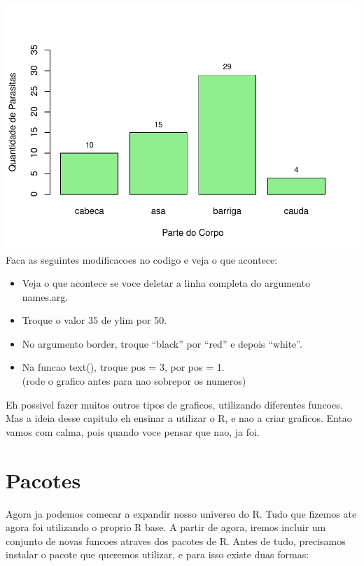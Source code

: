 \documentclass[
]{book}
\providecommand{\tightlist}{%
  \setlength{\itemsep}{0pt}\setlength{\parskip}{0pt}}
\begin{document}
\includegraphics{_main_files/figure-latex/4_basic_hist-1.pdf}
Faca as seguintes modificacoes no codigo e veja o que acontece:

\begin{itemize}
\tightlist
\item
  Veja o que acontece se voce deletar a linha completa do argumento names.arg.\\
\item
  Troque o valor 35 de ylim por 50.\\
\item
  No argumento border, troque ``black'' por ``red'' e depois ``white''.\\
\item
  Na funcao text(), troque pos = 3, por pos = 1.\\
  (rode o grafico antes para nao sobrepor os numeros)
\end{itemize}

Eh possivel fazer muitos outros tipos de graficos, utilizando diferentes funcoes. Mas a ideia desse capitulo eh ensinar a utilizar o R, e nao a criar graficos. Entao vamos com calma, pois quando voce pensar que nao, ja foi.

\hypertarget{pacotes}{%
\section{Pacotes}\label{pacotes}}

Agora ja podemos comecar a expandir nosso universo do R. Tudo que fizemos ate agora foi utilizando o proprio R base. A partir de agora, iremos incluir um conjunto de novas funcoes atraves dos pacotes de R.
Antes de tudo, precisamos instalar o pacote que queremos utilizar, e para isso existe duas formas:
\end{document}
